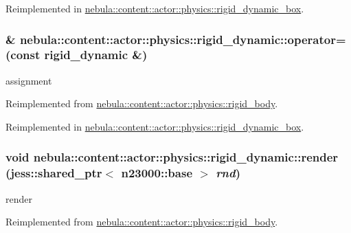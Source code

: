 Reimplemented in \hyperlink{classnebula_1_1content_1_1actor_1_1physics_1_1rigid__dynamic__box_a235e20a7e695a39c7ccb0100b90c10ee}{nebula::content::actor::physics::rigid\_\-dynamic\_\-box}.\hypertarget{classnebula_1_1content_1_1actor_1_1physics_1_1rigid__dynamic_a115e82dbc90ce5ae9f8d41724f1bd44d}{
\subsubsection[{operator=}]{\& nebula::content::actor::physics::rigid\_\-dynamic::operator= (const {\bf rigid\_\-dynamic} \&)}}
\label{classnebula_1_1content_1_1actor_1_1physics_1_1rigid__dynamic_a115e82dbc90ce5ae9f8d41724f1bd44d}


assignment 

Reimplemented from \hyperlink{classnebula_1_1content_1_1actor_1_1physics_1_1rigid__body_afeaa8197cacc9b3f9e2b618f0ee0443b}{nebula::content::actor::physics::rigid\_\-body}.

Reimplemented in \hyperlink{classnebula_1_1content_1_1actor_1_1physics_1_1rigid__dynamic__box_a26c54eacc3d28dd0b88e7a67fe6635f7}{nebula::content::actor::physics::rigid\_\-dynamic\_\-box}.\hypertarget{classnebula_1_1content_1_1actor_1_1physics_1_1rigid__dynamic_a24bc7fc5707d3d387e57d0516f1cbd0e}{
\subsubsection[{render}]{\setlength{\rightskip}{0pt plus 5cm}void nebula::content::actor::physics::rigid\_\-dynamic::render (jess::shared\_\-ptr$<$ {\bf n23000::base} $>$ {\em rnd})}}
\label{classnebula_1_1content_1_1actor_1_1physics_1_1rigid__dynamic_a24bc7fc5707d3d387e57d0516f1cbd0e}


render 

Reimplemented from \hyperlink{classnebula_1_1content_1_1actor_1_1physics_1_1rigid__body_a60e13499d8c37d216d3f25415ef33041}{nebula::content::actor::physics::rigid\_\-body}.

